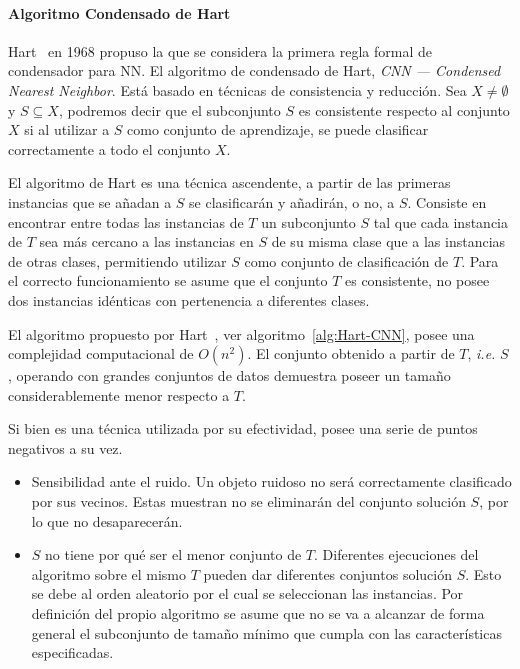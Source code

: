 \paragraph{Algoritmo Condensado de Hart}\label{paragraph:CNN}
\hfill \break
Hart~\cite{hart1968condensed} en 1968 propuso la que se considera la primera regla formal de condensador para NN. El algoritmo de condensado de Hart, \textit{CNN --- Condensed Nearest Neighbor}. Está basado en técnicas de consistencia y reducción. Sea $X \not= \emptyset$ y $S \subseteq X$, podremos decir que el subconjunto $S$ es consistente respecto al conjunto $X$ si al utilizar a $S$ como conjunto de aprendizaje, se puede clasificar correctamente a todo el conjunto $X$.

El algoritmo de Hart es una técnica ascendente, a partir de las primeras instancias que se añadan a $S$ se clasificarán y añadirán, o no, a $S$. Consiste en encontrar entre todas las instancias de $T$ un subconjunto $S$ tal que cada instancia de $T$ sea más cercano a las instancias en $S$ de su misma clase que a las instancias de otras clases, permitiendo utilizar $S$ como conjunto de clasificación de $T$. Para el correcto funcionamiento se asume que el conjunto $T$ es consistente, no posee dos instancias idénticas con pertenencia a diferentes clases.

El algoritmo propuesto por Hart~\cite{hart1968condensed}, ver algoritmo~\ref{alg:Hart-CNN}, posee una complejidad computacional de $O(n^2)$. El conjunto obtenido a partir de $T$, \textit{i.e.} $S$, operando con grandes conjuntos de datos demuestra poseer un tamaño considerablemente menor respecto a $T$. 

Si bien es una técnica utilizada por su efectividad, posee una serie de puntos negativos a su vez.
\begin{itemize}
\item Sensibilidad ante el ruido. Un objeto ruidoso no será correctamente clasificado por sus vecinos. Estas muestran no se eliminarán del conjunto solución $S$, por lo que no desaparecerán.
\item $S$ no tiene por qué ser el menor conjunto de $T$. Diferentes ejecuciones del algoritmo sobre el mismo $T$ pueden dar diferentes conjuntos solución $S$. Esto se debe al orden aleatorio por el cual se seleccionan las instancias. Por definición del propio algoritmo se asume que no se va a alcanzar de forma general el subconjunto de tamaño mínimo que cumpla con las características especificadas.
\end{itemize}

